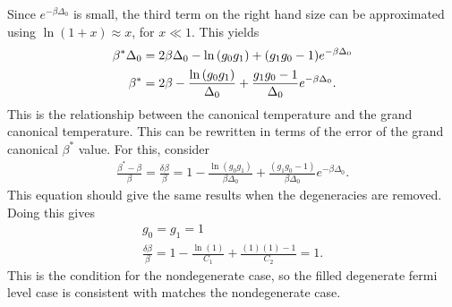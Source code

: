 Since $e^{-\beta\Delta_0}$ is small, the third term on the right hand size can be approximated using $\ln(1+x)\approx x$, for $x\ll1$. This yields
\begin{align}
    \beta^*\Delta_0&=2\beta\Delta_0-\ln\qty(g_0g_1)+(g_1g_0-1)e^{-\beta\Delta_0}\nonumber\\
    \beta^*&=2\beta-\frac{\ln\qty(g_0g_1)}{\Delta_0}+\frac{g_1g_0-1}{\Delta_0}e^{-\beta\Delta_0}.
\end{align} 
This is the relationship between the canonical temperature and the grand canonical temperature. This can be rewritten in terms of the error of the grand canonical $\beta^*$ value. For this, consider 
\begin{align}
    \frac{\beta^*-\beta}{\beta}=\frac{\delta\beta}{\beta}=1-\frac{\ln(g_0g_1)}{\beta\Delta_0}+\frac{(g_1g_0 - 1)}{\beta \Delta_0}e^{-\beta\Delta_0}. \label{filldegen}
\end{align}
This equation should give the same results when the degeneracies are removed. Doing this gives
\begin{gather}
    g_0=g_1=1\nonumber\\
    \frac{\delta\beta}{\beta}=1-\frac{\ln(1)}{C_1}+\frac{(1)(1)-1}{C_2}=1. \label{filldegencheck}
\end{gather}
This is the condition for the nondegenerate case, so the filled degenerate fermi level case is consistent with matches the nondegenerate case. 

